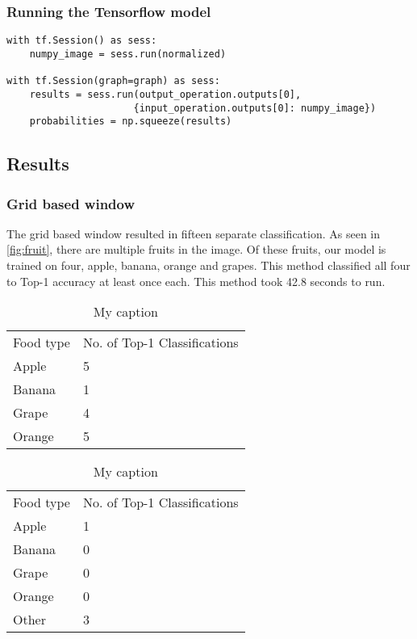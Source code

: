 \subsubsection*{Running the Tensorflow model}
\begin{lstlisting}
with tf.Session() as sess:
	numpy_image = sess.run(normalized)

with tf.Session(graph=graph) as sess:
    results = sess.run(output_operation.outputs[0],
                      {input_operation.outputs[0]: numpy_image})
	probabilities = np.squeeze(results)
\end{lstlisting}

\subsection*{Results}
\subsubsection*{Grid based window}
The grid based window resulted in fifteen separate classification. As seen in
\ref{fig:fruit}, there are multiple fruits in the image. Of these fruits, our
model is trained on four, apple, banana, orange and grapes. This method
classified all four to Top-1 accuracy at least once each. This method took 42.8
seconds to run.

\begin{table}[]
	\centering
	\caption{My caption}
	\label{my-label}
	\begin{tabular}{ll}
		Food type & No. of Top-1 Classifications \\
		Apple     & 5                      \\
		Banana    & 1                      \\
		Grape     & 4                      \\
		Orange    & 5                     
	\end{tabular}
\end{table}

\begin{table}[]
	\centering
	\caption{My caption}
	\label{rowWindowTable}
	\begin{tabular}{ll}
		Food type & No. of Top-1 Classifications \\
		Apple     & 1                      \\
		Banana    & 0                      \\
		Grape     & 0                      \\
		Orange    & 0                      \\
		Other     & 3                     
	\end{tabular}
\end{table}

